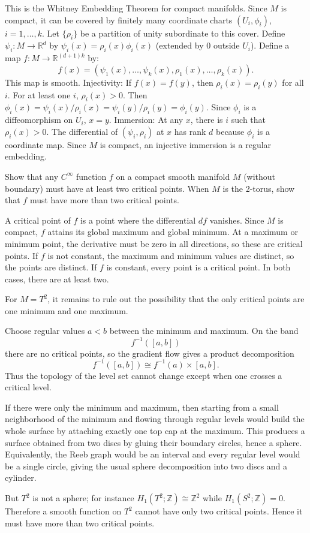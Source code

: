 \begin{solution}
This is the Whitney Embedding Theorem for compact manifolds.
Since $M$ is compact, it can be covered by finitely many coordinate charts $(U_i, \phi_i)$, $i=1, \dots, k$.
Let $\{\rho_i\}$ be a partition of unity subordinate to this cover.
Define $\psi_i: M \to \mathbb{R}^d$ by $\psi_i(x) = \rho_i(x) \phi_i(x)$ (extended by 0 outside $U_i$).
Define a map $f: M \to \mathbb{R}^{(d+1)k}$ by:
\[ f(x) = (\psi_1(x), \dots, \psi_k(x), \rho_1(x), \dots, \rho_k(x)). \]
This map is smooth.
Injectivity: If $f(x) = f(y)$, then $\rho_i(x) = \rho_i(y)$ for all $i$. For at least one $i$, $\rho_i(x) > 0$. Then $\phi_i(x) = \psi_i(x)/\rho_i(x) = \psi_i(y)/\rho_i(y) = \phi_i(y)$. Since $\phi_i$ is a diffeomorphism on $U_i$, $x=y$.
Immersion: At any $x$, there is $i$ such that $\rho_i(x) > 0$. The differential of $(\psi_i, \rho_i)$ at $x$ has rank $d$ because $\phi_i$ is a coordinate map.
Since $M$ is compact, an injective immersion is a regular embedding.
\end{solution}

\begin{exercise}
\label{geometry:2010:10}
Show that any $C^{\infty}$ function $f$ on a compact smooth manifold $M$ (without boundary) must have at least two critical points. When $M$ is the 2-torus, show that $f$ must have more than two critical points.
\end{exercise}

\begin{solution}
A critical point of $f$ is a point where the differential $df$ vanishes.
Since $M$ is compact, $f$ attains its global maximum and global minimum.
At a maximum or minimum point, the derivative must be zero in all directions, so these are critical points.
If $f$ is not constant, the maximum and minimum values are distinct, so the points are distinct.
If $f$ is constant, every point is a critical point. In both cases, there are at least two.

For $M=T^2$, it remains to rule out the possibility that the only critical points are one minimum and one maximum.

Choose regular values $a<b$ between the minimum and maximum. On the band
\[
f^{-1}([a,b])
\]
there are no critical points, so the gradient flow gives a product decomposition
\[
f^{-1}([a,b])\cong f^{-1}(a)\times[a,b].
\]
Thus the topology of the level set cannot change except when one crosses a critical level.

If there were only the minimum and maximum, then starting from a small neighborhood of the minimum and flowing through regular levels would build the whole surface by attaching exactly one top cap at the maximum. This produces a surface obtained from two discs by gluing their boundary circles, hence a sphere. Equivalently, the Reeb graph would be an interval and every regular level would be a single circle, giving the usual sphere decomposition into two discs and a cylinder.

But $T^2$ is not a sphere; for instance $H_1(T^2;\mathbb{Z})\cong\mathbb{Z}^2$ while $H_1(S^2;\mathbb{Z})=0$. Therefore a smooth function on $T^2$ cannot have only two critical points. Hence it must have more than two critical points.
\end{solution}


